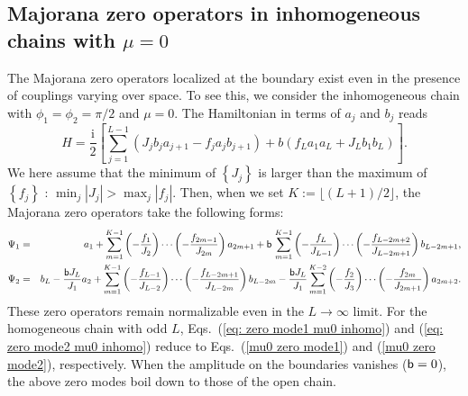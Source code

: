 \documentclass[aps, prb, showpacs, twocolumn, %
amssymb,superscriptaddress]{revtex4}
\newcommand{\ii}{\text{i}}
\begin{document}
\subsection{Majorana zero operators in inhomogeneous chains with $\mu=0$}
\label{sec:mu0 zero modes inhomogeneous}

The Majorana zero operators localized at the boundary exist even in the presence of couplings varying over space. To see this, we consider the inhomogeneous chain with $\phi_{1} = \phi_{2} = \pi/2$ and $\mu=0$. The Hamiltonian in terms of $a_j$ and $b_j$ reads
\begin{equation}
H = \frac{\ii}{2} \left[ \sum_{j=1}^{L-1} \left( J_{j} b_{j} a_{j+1} - f_{j} a_{j} b_{j+1} \right) + b \left( f_{L} a_{1} a_{L} + J_{L} b_{1} b_{L} \right) \right].
\end{equation}
We here assume that the minimum of $\left\{ J_{j} \right\}$ is larger than the maximum of $\left\{ f_{j} \right\}$ : $\min_{j} \left| J_{j} \right| > \max_{j} \left| f_{j} \right|$. Then, when we set $K := \lfloor \left( L+1 \right) /2 \rfloor$, the Majorana zero operators take the following forms:
\onecolumngrid
\begin{eqnarray}
\Psi_{1} &=& a_{1} + \sum_{m=1}^{K-1} \left( - \frac{f_{1}}{J_{2}} \right) \cdots \left( - \frac{f_{2m-1}}{J_{2m}} \right) a_{2m+1}
+ {\sf b}\, \sum_{m=1}^{K-1} \left( - \frac{f_{L}}{J_{L-1}} \right) \cdots \left( - \frac{f_{L-2m+2}}{J_{L-2m+1}} \right) b_{L-2m+1},  
	\label{eq: zero mode1 mu0 inhomo} \\
\Psi_{2} &=& b_{L} - \frac{{\sf b} J_{L}}{J_{1}} a_{2}
+ \sum_{m=1}^{K-1} \left( - \frac{f_{L-1}}{J_{L-2}} \right) \cdots \left( - \frac{f_{L-2m+1}}{J_{L-2m}} \right) b_{L-2m}
- \frac{{\sf b} J_{L}}{J_{1}} \sum_{m=1}^{K-2} \left( - \frac{f_{2}}{J_{3}} \right) \cdots \left( - \frac{f_{2m}}{J_{2m+1}} \right) a_{2m+2}.
	\label{eq: zero mode2 mu0 inhomo}
\end{eqnarray}
\twocolumngrid
These zero operators remain normalizable even in the $L \to \infty$ limit. For the homogeneous chain with odd $L$, Eqs.~(\ref{eq: zero mode1 mu0 inhomo}) and (\ref{eq: zero mode2 mu0 inhomo}) reduce to Eqs.~(\ref{mu0 zero mode1}) and (\ref{mu0 zero mode2}), respectively. When the amplitude on the boundaries vanishes (${\sf b} = 0$), the above zero modes boil down to those of the open chain.
\end{document}
